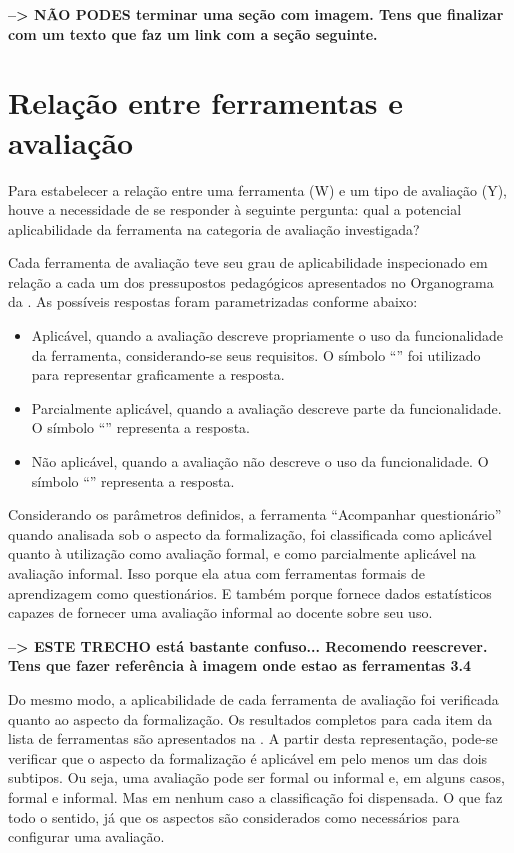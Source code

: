 \textbf{--> NÃO PODES terminar uma seção com imagem. Tens que finalizar com um texto que faz um link com a seção seguinte.}

\section{Relação entre ferramentas e avaliação}

Para estabelecer a relação entre uma ferramenta (W) e um tipo de avaliação (Y), houve a necessidade de se responder à seguinte pergunta: qual a potencial aplicabilidade da ferramenta na categoria de avaliação investigada?

Cada ferramenta de avaliação teve seu grau de aplicabilidade inspecionado em relação a cada um dos pressupostos pedagógicos apresentados no Organograma da . As possíveis respostas foram parametrizadas conforme abaixo:

\begin{itemize}
    \item Aplicável, quando a avaliação descreve propriamente o uso da funcionalidade da ferramenta, considerando-se seus requisitos. O símbolo ``'' foi utilizado para representar graficamente a resposta.
    \item Parcialmente aplicável, quando a avaliação descreve parte da funcionalidade. O símbolo ``'' representa a resposta. \item Não aplicável, quando a avaliação não descreve o uso da funcionalidade. O símbolo ``'' representa a resposta. 
\end{itemize}

Considerando os parâmetros definidos, a ferramenta ``Acompanhar questionário'' quando analisada sob o aspecto da formalização, foi classificada como aplicável quanto à utilização como avaliação formal, e como parcialmente aplicável na avaliação informal. Isso porque ela atua com ferramentas formais de aprendizagem como questionários. E também porque fornece dados estatísticos capazes de fornecer uma avaliação informal ao docente sobre seu uso.

\textbf{--> ESTE TRECHO está bastante confuso... Recomendo reescrever. Tens que fazer referência à imagem onde estao as ferramentas 3.4}

Do mesmo modo, a aplicabilidade de cada ferramenta de avaliação foi verificada quanto ao aspecto da formalização. Os resultados completos para cada item da lista de ferramentas são apresentados na . A partir desta representação, pode-se verificar que o aspecto da formalização é aplicável em pelo menos um das dois subtipos. Ou seja, uma avaliação pode ser formal ou informal e, em alguns casos, formal e informal. Mas em nenhum caso a classificação foi dispensada. O que faz todo o sentido, já que os aspectos são considerados como necessários para configurar uma avaliação.

